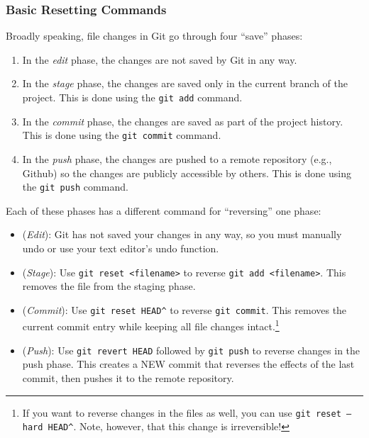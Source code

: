 \documentclass[12pt]{article}
\begin{document}
\subsubsection{Basic Resetting Commands}
Broadly speaking, file changes in Git go through four ``save'' phases:
\begin{enumerate}
    \item In the \emph{edit} phase, the changes are not saved by Git in any way.
    \item In the \emph{stage} phase, the changes are saved only in the current branch of the project. This is done using the \texttt{git add} command.
    \item In the \emph{commit} phase, the changes are saved as part of the project history. This is done using the \texttt{git commit} command.
    \item In the \emph{push} phase, the changes are pushed to a remote repository (e.g., Github) so the changes are publicly accessible by others. This is done using the \texttt{git push} command.
\end{enumerate}
Each of these phases has a different command for ``reversing'' one phase:
\begin{itemize}
    \item (\emph{Edit}): Git has not saved your changes in any way, so you must manually undo or use your text editor's undo function.
    \item (\emph{Stage}): Use \texttt{git reset <filename>} to reverse \texttt{git add <filename>}. This removes the file from the staging phase.
    \item (\emph{Commit}): Use \texttt{git reset HEAD\^} to reverse \texttt{git commit}. This removes the current commit entry while keeping all file changes intact.\footnote{If you want to reverse changes in the files as well, you can use \texttt{git reset --hard HEAD\^}. Note, however, that this change is irreversible!}
    \item (\emph{Push}): Use \texttt{git revert HEAD} followed by \texttt{git push} to reverse changes in the push phase. This creates a NEW commit that reverses the effects of the last commit, then pushes it to the remote repository.
\end{itemize}
\end{document}
